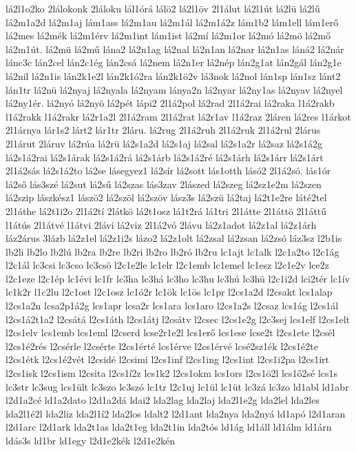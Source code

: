 {lá2l1o2ko
2lálokonk
2láloku
lál1órá
lálö2
lá2l1öv
2l1álut
lá2l1út
lá2lü
lá2lű
lá2m1a2d
lá2m1aj
lám1ass
lá2m1au
lá2m1ál
lá2m1á2z
lám1b2
lám1ell
lám1erő
lá2mes
lá2mék
lá2m1érv
lá2m1int
lám1ist
lá2mí
lá2m1or
lá2mó
lá2mö
lá2mő
lá2m1út.
lá2mü
lá2mű
lána2
lá2n1ag
lá2nal
lá2n1an
lá2nar
lá2n1as
láná2
lá2nár
lánc3c
lán2cel
lán2c1ég
lán2csá
lá2nem
lá2n1er
lá2nép
lán2g1at
lán2gál
lán2g1e
lá2nil
lá2n1is
lán2k1e2l
lán2k1ó2ra
lán2k1ö2v
lá3nok
lá2nol
lán1sp
lán1sz
lánt2
lán1tr
lá2nü
lá2nyaj
lá2nyala
lá2nyam
lánya2n
lá2nyar
lá2ny1as
lá2nyav
lá2nyel
lá2ny1ér.
lá2nyó
lá2nyö
lá2pét
lápi2
2l1á2pol
lá2rad
2l1á2rai
lá2raka
l1á2rakb
l1á2rakk
l1á2rakr
lá2r1a2l
2l1á2ram
2l1á2rat
lá2r1av
l1á2raz
2láren
lá2res
l1árkot
2l1árnya
lár1s2
lárt2
lár1tr
2láru.
lá2rug
2l1á2ruh
2l1á2ruk
2l1á2rul
2lárus
2l1árut
2láruv
lá2rúa
lá2rü
lá2s1a2d
lá2s1aj
lá2sal
lá2s1a2r
lá2saz
lá2s1á2g
lá2s1á2rai
lá2s1árak
lá2s1á2rá
lá2s1árb
lá2s1á2ré
lá2s1árh
lá2s1árr
lá2s1árt
2l1á2sás
lá2s1á2to
lá2se
lásegyez1
lá2sír
lá2sott
lás1otth
lásó2
2l1á2só.
lás1ór
lá2ső
lás3szé
lá2sut
lá2sű
lá2szas
lás3zav
2lászed
lá2szeg
lá2sz1e2m
lá2szen
lá2szip
lászkész1
lászö2
lá2szöl
lá2szöv
lász3s
lá2szü
lá2taj
lá2t1e2re
láté2tel
2l1áthe
lá2t1i2o
2l1á2tí
2látkö
lá2t1osz
lá1t2rá
lá1tri
2l1átte
2l1áttö
2l1áttű
l1átús
2l1átvé
l1átvi
2lávi
lá2viz
2l1á2vó
2lávu
lá2z1adot
lá2z1al
lá2z1árh
láz2árus
3lázb
lá2z1el
lá2z1i2s
lázo2
lá2z1olt
lá2zsal
lá2zsan
lá2zsó
láz3sz
l2b1is
lb2li
lb2lo
lb2lú
lb2ra
lb2re
lb2ri
lb2ro
lb2ró
lb2ru
lc1ajt
lc1alk
l2c1a2to
l2c1ág
l2c1ál
lc3csi
lc3cso
lc3csö
l2c1e2le
lc1elr
l2c1emb
lc1emel
lc1esz
l2c1e2v
lce2z
l2c1eze
l2c1ép
lc1évi
lc1fr
lc3ha
lc3há
lc3ho
lc3hu
lc3hú
lc3hü
l2c1i2d
lci2tér
lc1ív
lc1k2r
l1c2lu
l2c1ost
l2c1osz
lc1ó2r
lc1ök
lc1ös
lc1pr
l2cs1a2d
l2csakt
lcs1alap
l2cs1a2n
lcsa2p1á2g
lcs1apr
lcsa2r
lcs1ara
lcs1aro
l2cs1a2s
l2csaz
lcs1ág
l2cs1ál
l2cs1á2t1a2
l2csátá
l2cs1áth
l2cs1átj
l2csátv
l2csec
l2cs1e2g
l2c3sej
lcs1elf
l2cs1elt
l2cs1elv
lcs1emb
lcs1eml
l2cserd
lcse2r1e2l
lcs1erő
lcs1ese
lcse2t
l2cs1ete
l2csél
l2cs1é2rés
l2csérle
l2csérte
l2cs1érté
lcs1érve
l2cs1érvé
lcsé2sz1ék
l2cs1é2te
l2cs1étk
l2cs1é2vét
l2csidé
l2csimi
l2cs1inf
l2cs1ing
l2cs1int
l2cs1i2pa
l2cs1irt
l2cs1isk
l2cs1ism
l2csita
l2cs1í2z
lcs1k2
l2cs1okm
lcs1ors
l2cs1ö2l
lcs1ő2sé
lcs1s
lc3str
lc3sug
lcs1ült
lc3szo
lc3szó
lc1tr
l2c1uj
lc1ül
lc1üt
lc3zá
lc3zo
ld1abl
ld1abr
l2d1a2cé
ld1a2dato
l2d1a2dá
ldai2
lda2lag
lda2laj
lda2l1e2g
lda2lel
lda2les
lda2l1é2l
lda2liz
lda2l1í2
lda2los
ldalt2
l2d1ant
lda2nya
lda2nyá
ld1apó
l2d1aran
l2d1arc
l2d1ark
lda2t1as
lda2t1eg
lda2t1in
lda2tós
ld1ág
ld1áll
ld1álm
ld1árn
ldás3s
ld1br
ld1egy
l2d1e2kék
l2d1e2kén
}
